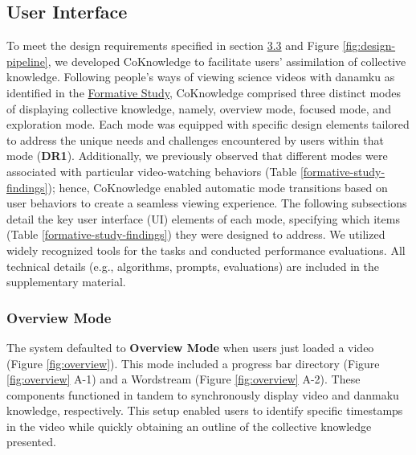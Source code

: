\subsection{User Interface}
\label{ui}

To meet the design requirements specified in section \hyperref[drs]{3.3} and Figure \ref{fig:design-pipeline}, we developed CoKnowledge to facilitate users' assimilation of collective knowledge. 
Following people's ways of viewing science videos with danamku as identified in the \hyperref[formative-study]{Formative Study}, 
CoKnowledge comprised three distinct modes of displaying collective knowledge, namely, overview mode, focused mode, and exploration mode. Each mode was equipped with specific design elements tailored to address the unique needs and challenges encountered by users within that mode (\textbf{DR1}). Additionally, we previously observed that different modes were associated with particular video-watching behaviors (Table \ref{formative-study-findings}); hence, CoKnowledge enabled automatic mode transitions based on user behaviors to create a seamless viewing experience.
The following subsections detail 
the key user interface (UI) elements of each mode, specifying which items (Table \ref{formative-study-findings}) 
they were designed to address.
We utilized widely recognized tools for the tasks and conducted performance evaluations. All technical details (e.g., algorithms, prompts, evaluations) are included in the supplementary material. 




\subsubsection{Overview Mode}
\label{overview-mode}

The system defaulted to
\textbf{Overview Mode} when users just loaded a video (Figure \ref{fig:overview}).
This mode included a progress bar directory (Figure \ref{fig:overview} A-1) and a Wordstream (Figure \ref{fig:overview} A-2). 
These components functioned in tandem to synchronously display video and danmaku knowledge, respectively. This setup enabled users to identify specific timestamps in the video while quickly obtaining an outline of the collective knowledge presented.

